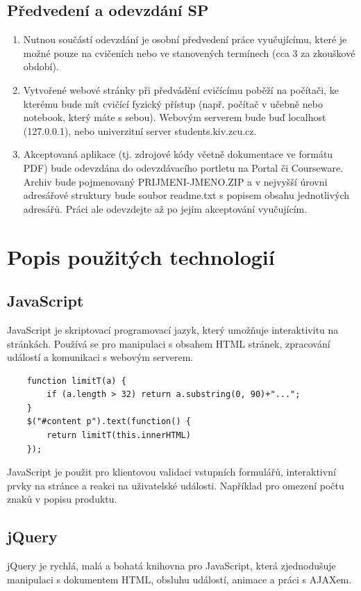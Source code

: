 \documentclass[12pt, a4paper]{report}
\begin{document}
\subsection{Předvedení a odevzdání SP}
\begin{enumerate}[left=1cm] %
\item Nutnou součástí odevzdání je osobní předvedení práce vyučujícímu, které je možné pouze na cvičeních nebo ve stanovených termínech (cca 3 za zkouškové období).
\item Vytvořené webové stránky při předvádění cvičícímu poběží na počítači, ke kterému bude mít cvičící fyzický přístup (např. počítač v učebně nebo notebook, který máte s sebou). Webovým serverem bude buď localhost (127.0.0.1), nebo univerzitní server students.kiv.zcu.cz.
\item Akceptovaná aplikace (tj. zdrojové kódy včetně dokumentace ve formátu PDF) bude odevzdána do odevzdávacího portletu na Portal či Courseware. Archiv bude pojmenovaný PRIJMENI-JMENO.ZIP a v nejvyšší úrovni adresářové struktury bude soubor readme.txt s popisem obsahu jednotlivých adresářů. Práci ale odevzdejte až po jejím akceptování vyučujícím.
\end{enumerate}


\section{Popis použitých technologií}
\subsection{JavaScript}
JavaScript je skriptovací programovací jazyk, který umožňuje interaktivitu na stránkách. Používá se pro manipulaci s obsahem HTML stránek, zpracování událostí a komunikaci s webovým serverem.

\begin{lstlisting}
    function limitT(a) {
        if (a.length > 32) return a.substring(0, 90)+"...";
    }
    $("#content p").text(function() {
        return limitT(this.innerHTML)
    });
\end{lstlisting}
JavaScript je použit pro klientovou validaci vstupních formulářů, interaktivní prvky na stránce a reakci na uživatelské události.
Například pro omezení počtu znaků v popisu produktu.

\subsection{jQuery}
jQuery je rychlá, malá a bohatá knihovna pro JavaScript, která zjednodušuje manipulaci s dokumentem HTML, obsluhu událostí, animace a práci s AJAXem.
\end{document}

